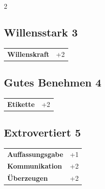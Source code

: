 \begin{multicols}{2}
\begin{tcolorbox}

\end{tcolorbox}

\begin{tcolorbox}
    \subsection*{Willensstark \hfill \small{3 }}
    \tcblower




\begin{tabular}{@{}ll@{}}
    \textbf{Willenskraft} & +2\\
\end{tabular}


\end{tcolorbox}

\begin{tcolorbox}
    \subsection*{Gutes Benehmen \hfill \small{4 }}
    \tcblower




\begin{tabular}{@{}ll@{}}
    \textbf{Etikette} & +2\\
\end{tabular}


\end{tcolorbox}

\begin{tcolorbox}
    \subsection*{Extrovertiert \hfill \small{5 }}
    \tcblower




\begin{tabular}{@{}ll@{}}
    \textbf{Auffassungsgabe} & +1\\
    \textbf{Kommunikation} & +2\\
    \textbf{Überzeugen} & +2\\
\end{tabular}


\end{tcolorbox}
\end{multicols}
